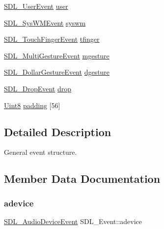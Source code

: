 \begin{DoxyCompactItemize}
\mbox{\hyperlink{struct_s_d_l___user_event}{S\+D\+L\+\_\+\+User\+Event}} \mbox{\hyperlink{union_s_d_l___event_ab7c394e3ce7bf1e4f8d68bc0e9f1b042}{user}}
\item 
\mbox{\hyperlink{struct_s_d_l___sys_w_m_event}{S\+D\+L\+\_\+\+Sys\+W\+M\+Event}} \mbox{\hyperlink{union_s_d_l___event_ab3b2eaf5348d4c50a51b1f297fdef537}{syswm}}
\item 
\mbox{\hyperlink{struct_s_d_l___touch_finger_event}{S\+D\+L\+\_\+\+Touch\+Finger\+Event}} \mbox{\hyperlink{union_s_d_l___event_ab18d7d60794cb056948ffa58541bc3c5}{tfinger}}
\item 
\mbox{\hyperlink{struct_s_d_l___multi_gesture_event}{S\+D\+L\+\_\+\+Multi\+Gesture\+Event}} \mbox{\hyperlink{union_s_d_l___event_ac19b3c6a6b5181a51eb4fbe2cbe726a9}{mgesture}}
\item 
\mbox{\hyperlink{struct_s_d_l___dollar_gesture_event}{S\+D\+L\+\_\+\+Dollar\+Gesture\+Event}} \mbox{\hyperlink{union_s_d_l___event_a4481167b9f8549aeb254e97ca812e74d}{dgesture}}
\item 
\mbox{\hyperlink{struct_s_d_l___drop_event}{S\+D\+L\+\_\+\+Drop\+Event}} \mbox{\hyperlink{union_s_d_l___event_acff77bccbca65abbb876360a3f5209c9}{drop}}
\item 
\mbox{\hyperlink{_s_d_l__stdinc_8h_a2944638813a090aa23e62f4da842c3e2}{Uint8}} \mbox{\hyperlink{union_s_d_l___event_aabb599570edfa54aad6255c1f24f2ad2}{padding}} \mbox{[}56\mbox{]}
\end{DoxyCompactItemize}


\subsection{Detailed Description}
General event structure. 

\subsection{Member Data Documentation}
\mbox{\label{union_s_d_l___event_a111e01fcac4fd8e251a6058ff9f17e72}} 
\subsubsection{\texorpdfstring{adevice}{adevice}}
{\footnotesize\ttfamily \mbox{\hyperlink{struct_s_d_l___audio_device_event}{S\+D\+L\+\_\+\+Audio\+Device\+Event}} S\+D\+L\+\_\+\+Event\+::adevice}

